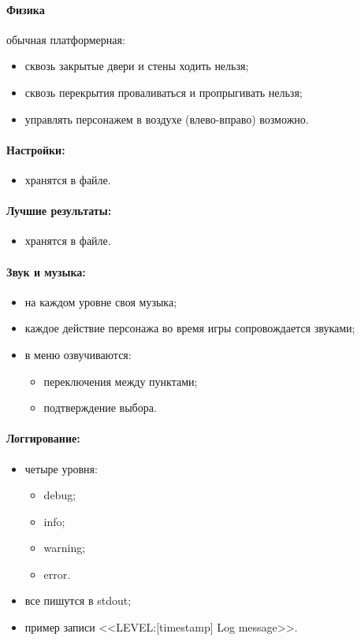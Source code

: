 \documentclass[12pt,a4paper,fullpage,titlepage]{article}
\begin{document}
\paragraph{Физика} обычная платформерная:
\begin{itemize}
	\item сквозь закрытые двери и стены ходить нельзя;
	\item сквозь перекрытия проваливаться и пропрыгивать нельзя;
	\item управлять персонажем в воздухе (влево-вправо) возможно.
\end{itemize}

\paragraph{Настройки:}
\begin{itemize}
	\item хранятся в файле.
\end{itemize}

\paragraph{Лучшие результаты:}
\begin{itemize}
	\item хранятся в файле.
\end{itemize}

\paragraph{Звук и музыка:}
\begin{itemize}
	\item на каждом уровне своя музыка;
	\item каждое действие персонажа во время игры сопровождается звуками;
	\item в меню озвучиваются:
	\begin{itemize}
		\item переключения между пунктами;
		\item подтверждение выбора.
	\end{itemize}
\end{itemize}

\paragraph{Логгирование:}
\begin{itemize}
	\item четыре уровня:
	\begin{itemize}
		\item debug;
		\item info;
		\item warning;
		\item error.
	\end{itemize}
	\item все пишутся в stdout;
	\item пример записи <<LEVEL:[timestamp] Log message>>.
\end{itemize}
\end{document}

